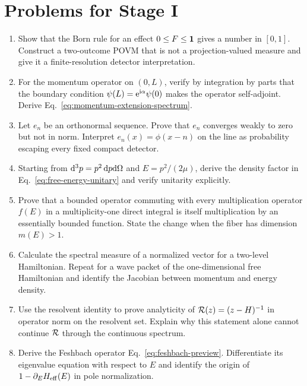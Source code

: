 \section{Problems for Stage I}
\label{problems:stage-I}

\begin{enumerate}[label=\textbf{I.\arabic*},leftmargin=*]
  \item Show that the Born rule for an effect $0\leq F\leq\mathbf{1}$ gives a
  number in $[0,1]$.  Construct a two-outcome POVM that is not a projection-valued measure and give it a finite-resolution detector interpretation.

  \item For the momentum operator on $(0,L)$, verify by integration by parts
  that the boundary condition $\psi(L)=\mathrm{e}^{\mathrm{i}\alpha}\psi(0)$ makes the
  operator self-adjoint.  Derive Eq.~\eqref{eq:momentum-extension-spectrum}.

  \item Let $e_n$ be an orthonormal sequence.  Prove that $e_n$ converges
  weakly to zero but not in norm.  Interpret $e_n(x)=\phi(x-n)$ on the line as
  probability escaping every fixed compact detector.

  \item Starting from $\mathrm{d}^3p=p^2\,\mathrm{d} p\mathrm{d}\Omega$ and
  $E=p^2/(2\mu)$, derive the density factor in
  Eq.~\eqref{eq:free-energy-unitary} and verify unitarity explicitly.

  \item Prove that a bounded operator commuting with every multiplication
  operator $f(E)$ in a multiplicity-one direct integral is itself
  multiplication by an essentially bounded function.  State the change when
  the fiber has dimension $m(E)>1$.

  \item Calculate the spectral measure of a normalized vector for a
  two-level Hamiltonian.  Repeat for a wave packet of the one-dimensional free
  Hamiltonian and identify the Jacobian between momentum and energy density.

  \item Use the resolvent identity to prove analyticity of
  $\mathcal{R}(z)=(z-H)^{-1}$ in operator norm on the resolvent set.  Explain why this
  statement alone cannot continue $\mathcal{R}$ through the continuous spectrum.

  \item Derive the Feshbach operator
  Eq.~\eqref{eq:feshbach-preview}.  Differentiate its eigenvalue equation with
  respect to $E$ and identify the origin of
  $1-\partial_EH_{\mathrm{eff}}(E)$ in pole normalization.


\end{enumerate}
